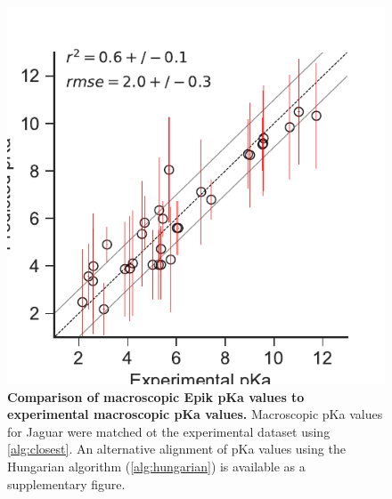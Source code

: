 \documentclass[9pt,lineno,final]{elife}
\begin{document}
\begin{figure}[H]
\centering
\includegraphics[]{closest_pka_epik_typeIII.pdf}
\caption{{\bf Comparison of macroscopic Epik pKa values to experimental macroscopic pKa values.} Macroscopic pKa values for Jaguar were matched ot the experimental dataset using \cref{alg:closest}. An alternative alignment of pKa values using the Hungarian algorithm (\cref{alg:hungarian}) is available as a supplementary figure. \label{correlation-closest-epikiii}}


\end{figure}
    
\end{document}
